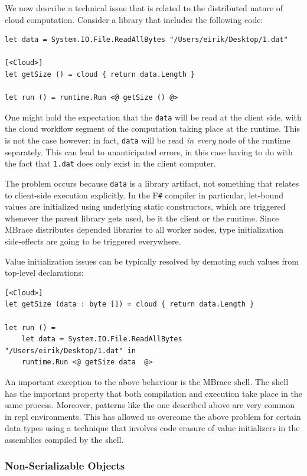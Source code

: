 \documentclass[9pt,a4paper]{article}
\newcommand{\mbrace}{MBrace}
\newcommand{\fsharp}{F\texttt \#}
\begin{document}
We now describe a technical issue that is related to the distributed nature of cloud computation.
Consider a library that includes the following code:
\begin{lstlisting}
let data = System.IO.File.ReadAllBytes "/Users/eirik/Desktop/1.dat"

[<Cloud>]
let getSize () = cloud { return data.Length }

let run () = runtime.Run <@ getSize () @>
\end{lstlisting}
One might hold the expectation that the \texttt{data} will be read at the client side,
with the cloud workflow segment of the computation taking place at the runtime.
This is not the case however: in fact, \texttt{data} will be read \emph{in every}
node of the runtime separately. This can lead to unanticipated errors, in this case
having to do with the fact that \texttt{1.dat} does only exist in the client computer.

The problem occurs because \texttt{data} is a library artifact, not something
that relates to client-side execution explicitly. In the \fsharp{} compiler in particular,
let-bound values are initialized using underlying static constructors, which are triggered
whenever the parent library gets used, be it the client or the runtime.
Since \mbrace{} distributes depended libraries to all worker nodes, type initialization 
side-effects are going to be triggered everywhere.

Value initialization issues can be typically resolved by demoting such values from top-level
declarations:
\begin{lstlisting}
[<Cloud>]
let getSize (data : byte []) = cloud { return data.Length }

let run () = 
	let data = System.IO.File.ReadAllBytes "/Users/eirik/Desktop/1.dat" in
	runtime.Run <@ getSize data  @>
\end{lstlisting}

An important exception to the above behaviour is the \mbrace{} shell. The shell has the 
important property that both compilation and execution take place in the same process. 
Moreover, patterns like the one described above are very common in repl environments.
This has allowed us overcome the above problem for certain data types using a technique
that involves code erasure of value initializers in the assemblies compiled by the shell.

\subsubsection*{Non-Serializable Objects}
\end{document}
